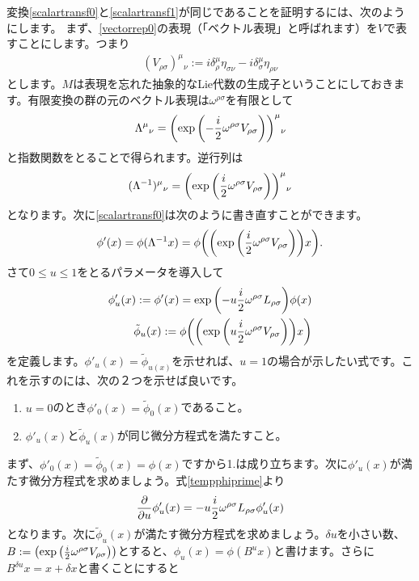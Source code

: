 \documentclass[report,paper=a4, fontsize=12pt, line_length=16cm, number_of_lines=33,dvipdfmx]{jlreq}
\numberwithin{equation}{chapter}
\newcommand{\phit}{\tilde{\phi}}
\begin{document}
変換\eqref{scalartransf0}と\eqref{scalartransf1}が同じであることを証明するには、次のようにします。
まず、\eqref{vectorrep0}の表現（「ベクトル表現」と呼ばれます）を$V$で表すことにします。つまり
\begin{align}
  (V_{\rho\sigma})^{\mu}{}_{\nu}:=i\delta^{\mu}_{\rho}\eta_{\sigma\nu}-i\delta^{\mu}_{\sigma}\eta_{\rho\nu}
\end{align}
とします。$M$は表現を忘れた抽象的なLie代数の生成子ということにしておきます。有限変換の群の元のベクトル表現は$\omega^{\rho\sigma}$を有限として
\begin{align}
  \Lambda^{\mu}{}_{\nu}=\qty(\exp\qty(-\frac{i}{2}\omega^{\rho\sigma}V_{\rho\sigma}))^{\mu}{}_{\nu}\label{finiteomega}
\end{align}
と指数関数をとることで得られます。逆行列は
\begin{align}
  (\Lambda^{-1})^{\mu}{}_{\nu}=\qty(\exp\qty(\frac{i}{2}\omega^{\rho\sigma}V_{\rho\sigma}))^{\mu}{}_{\nu} 
\end{align}
となります。次に\eqref{scalartransf0}は次のように書き直すことができます。
\begin{align}
  \phi'(x)=\phi(\Lambda^{-1}x)=\phi\qty(\qty(\exp\qty(\frac{i}{2}\omega^{\rho\sigma}V_{\rho\sigma}))x).
\end{align}
さて$0\le u \le 1$をとるパラメータを導入して
\begin{align}
  \phi'_{u}(x):=\phi'(x)=\exp\qty(-u\frac{i}{2}\omega^{\rho\sigma}L_{\rho\sigma})\phi(x)\label{tempphiprime}\\
  \phit_{u}(x):=\phi\qty(\qty(\exp\qty(u\frac{i}{2}\omega^{\rho\sigma}V_{\rho\sigma}))x)\label{tempphitilde}
\end{align}
を定義します。$\phi'_{u}(x)=\phit_{u(x)}$を示せれば、$u=1$の場合が示したい式です。これを示すのには、次の２つを示せば良いです。
\begin{enumerate}
  \item $u=0$のとき$\phi'_{0}(x)=\phit_{0}(x)$であること。
  \item $\phi'_{u}(x)$と$\phit_{u}(x)$が同じ微分方程式を満たすこと。
\end{enumerate}
まず、$\phi'_{0}(x)=\phit_{0}(x)=\phi(x)$ですから1.は成り立ちます。次に$\phi'_{u}(x)$が満たす微分方程式を求めましょう。式\eqref{tempphiprime}より
\begin{align}
  \pdv{u} \phi'_{u}(x)=-u\frac{i}{2}\omega^{\rho\sigma}L_{\rho\sigma}\phi'_{u}(x)\label{tempdiffeqprime}
\end{align}
となります。次に$\phit_{u}(x)$が満たす微分方程式を求めましょう。$\delta u$を小さい数、$B:=\qty(\exp\qty(\frac{i}{2}\omega^{\rho\sigma}V_{\rho\sigma}))$とすると、$\phi_u(x)=\phi(B^ux)$と書けます。さらに$B^{\delta u}x=x+\delta x$と書くことにすると
\end{document}
